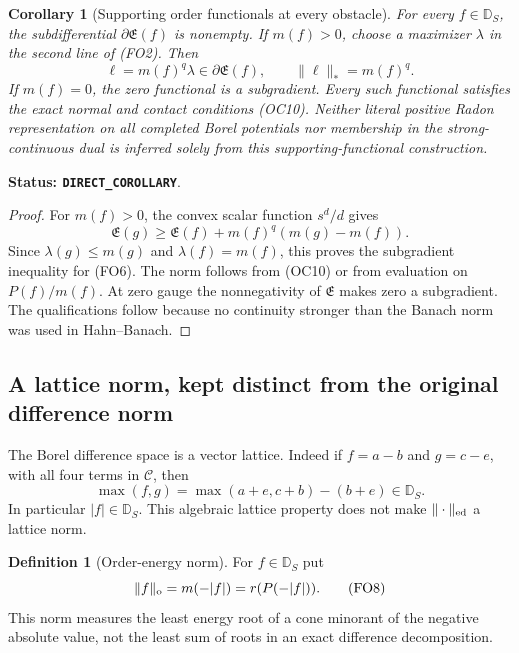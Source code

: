\documentclass[11pt,a4paper]{article}
\numberwithin{equation}{section}
\newtheorem{corollary}[theorem]{Corollary}
\theoremstyle{definition}
\newtheorem{definition}[theorem]{Definition}
\theoremstyle{remark}
\begin{document}
\begin{corollary}[Supporting order functionals at every obstacle]
\label{cor:r12-obstacle-support-existence}
For every $f\in\mathbb D_S$, the subdifferential
$\partial\mathfrak E(f)$ is nonempty.  If $m(f)>0$,
choose a maximizer $\lambda$ in the second line of
\textup{(FO2)}.  Then
\[
          \ell=m(f)^q\lambda\in\partial\mathfrak E(f),
          \qquad\|\ell\|_*=m(f)^q.
 \tag{FO6}
\]
If $m(f)=0$, the zero functional is a subgradient.
Every such functional satisfies the exact normal and contact
conditions \textup{(OC10)}.  Neither literal positive
Radon representation on all completed Borel potentials
nor membership in the strong-continuous dual is inferred
solely from this supporting-functional construction.
\end{corollary}

\noindent\textbf{Status: \texttt{DIRECT\_COROLLARY}}.

\begin{proof}
For $m(f)>0$, the convex scalar function $s^d/d$ gives
\[
 \mathfrak E(g)\ge\mathfrak E(f)
                 +m(f)^q(m(g)-m(f)).
\]
Since $\lambda(g)\le m(g)$ and $\lambda(f)=m(f)$,
this proves the subgradient inequality for \textup{(FO6)}.
The norm follows from \textup{(OC10)} or from evaluation
on $P(f)/m(f)$.  At zero gauge the nonnegativity of
$\mathfrak E$ makes zero a subgradient.  The qualifications
follow because no continuity stronger than the Banach norm
was used in Hahn--Banach.
\end{proof}

\subsection{A lattice norm, kept distinct from the original difference norm}

The Borel difference space is a vector lattice.  Indeed if
$f=a-b$ and $g=c-e$, with all four terms in $\mathscr C$,
then
\[
 \max(f,g)=\max(a+e,c+b)-(b+e)\in\mathbb D_S.
 \tag{FO7}
\]
In particular $|f|\in\mathbb D_S$.  This algebraic
lattice property does not make $\|\cdot\|_{\rm ed}$
a lattice norm.

\begin{definition}[Order-energy norm]
\label{def:r12-order-energy-norm}
For $f\in\mathbb D_S$ put
\[
               \|f\|_{\rm o}=m(-|f|)=r(P(-|f|)).
 \tag{FO8}
\]
This norm measures the least energy root of a cone
minorant of the negative absolute value, not the least
sum of roots in an exact difference decomposition.
\end{definition}
\end{document}
